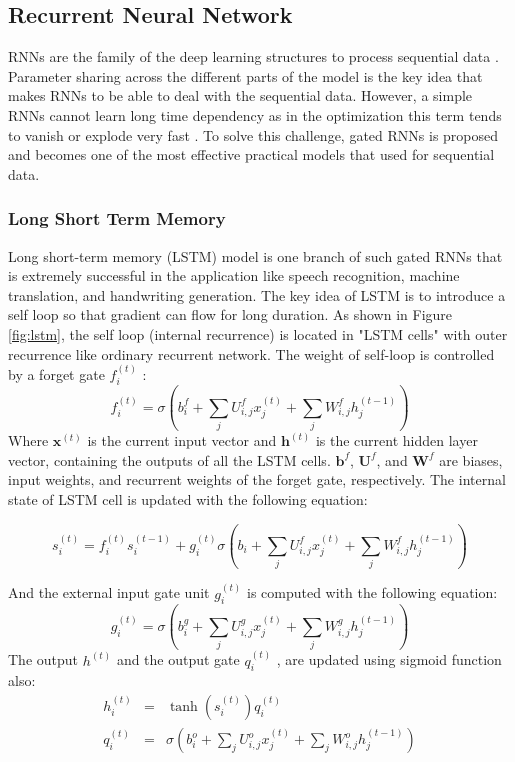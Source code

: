 \subsection{Recurrent Neural Network}  
RNNs are the family of the deep learning structures to process sequential data  \cite{rumelhart1986}.
%
Parameter sharing across the different parts of the model is the key idea that makes RNNs to be able to deal with the sequential data.
%
However, a simple RNNs cannot learn long time dependency as in the optimization this term tends to vanish or explode very fast \cite{goodfellow2016deeplearning}.
%
To solve this challenge, gated RNNs is proposed and becomes one of the most effective practical models that used for sequential data.

\subsubsection{Long Short Term Memory}
Long short-term memory (LSTM) model \cite{hochreiter1997lstm} is one branch of such gated RNNs that is extremely successful in the application like speech recognition, machine translation, and handwriting generation.
%
The key idea of LSTM is to introduce a self loop so that gradient can flow for long duration. As shown in Figure \ref{fig:lstm}, the self loop (internal recurrence) is located in "LSTM cells" with outer recurrence like ordinary recurrent network. The weight of self-loop is controlled by a forget gate \(f_i^{(t)}\)
:
\[f_i^{(t)} = \sigma (b_i^f + \sum_{j}U_{i,j}^f x_j^{(t)} +\sum_{j}W_{i,j}^f h_j^{(t-1)} ) \]
Where \(\boldsymbol{x}^{(t)}\) is the current input vector and \(\boldsymbol{h}^{(t)}\) is the current hidden layer vector, containing the outputs of all the LSTM cells. \(\boldsymbol{b}^f\), \(\boldsymbol{U}^f\), and \(\boldsymbol{W}^f\) are biases, input weights, and recurrent weights of the forget gate, respectively. The internal state of LSTM cell is updated with the following equation:
\begin{small}
\[s_i^{(t)} = f_i^{(t)}s_i^{(t-1)}+g_i^{(t)}\sigma(b_i + \sum_{j}U_{i,j}^f x_j^{(t)} +\sum_{j}W_{i,j}^f h_j^{(t-1)} )\]
\end{small}
And the external input gate unit
\(g_i^{(t)} \)
is computed with the following equation:
\[g_i^{(t)} = \sigma (b_i^g + \sum_{j}U_{i,j}^g x_j^{(t)} +\sum_{j}W_{i,j}^g h_j^{(t-1)} ) \]
The output
\(h^{(t)}\)
and the output gate
\(q_i^{(t)}\)
, are updated using sigmoid function also:
\begin{eqnarray*}
h_i^{(t)} &=& \tanh (s_i^{(t)})q_i^{(t)}\\
q_i^{(t)} &=& \sigma (b_i^o + \sum_{j}U_{i,j}^o x_j^{(t)} +\sum_{j}W_{i,j}^o h_j^{(t-1)} )
\end{eqnarray*}

